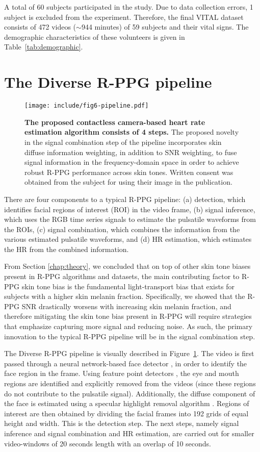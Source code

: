 A total of 60 subjects participated in the study. Due to data collection errors, 1 subject is excluded from the experiment. Therefore, the final VITAL dataset consists of 472 videos ($\sim$944 minutes) of 59 subjects and their vital signs. The demographic characteristics of these volunteers is given in Table~\ref{tab:demographic}.

\section{The Diverse R-PPG pipeline}

\begin{figure}
    \centering
    \texttt{[image: include/fig6-pipeline.pdf]}
    \caption{\textbf{The proposed contactless camera-based heart rate estimation algorithm consists of 4 steps.} The proposed novelty in the signal combination step of the pipeline incorporates skin diffuse information weighting, in addition to SNR weighting, to fuse signal information in the frequency-domain space in order to achieve robust R-PPG performance across skin tones. Written consent was obtained from the subject for using their image in the publication.}
    \label{fig:pipeline}
\end{figure}

There are four components to a typical R-PPG pipeline: (a) detection, which identifies facial regions of interest (ROI) in the video frame, (b) signal inference, which uses the RGB time series signals to estimate the pulsatile waveforms from the ROIs, (c) signal combination, which combines the information from the various estimated pulsatile waveforms, and (d) HR estimation, which estimates the HR from the combined information. 

From Section \ref{chap:theory}, we concluded that on top of other skin tone biases present in R-PPG algorithms and datasets, the main contributing factor to R-PPG skin tone bias is the fundamental light-transport bias that exists for subjects with a higher skin melanin fraction. Specifically, we showed that the R-PPG SNR drastically worsens with increasing skin melanin fraction, and therefore mitigating the skin tone bias present in R-PPG will require strategies that emphasize capturing more signal and reducing noise. As such, the primary innovation to the typical R-PPG pipeline will be in the signal combination step.  

The Diverse R-PPG pipeline is visually described in Figure~\ref{fig:pipeline}. The video is first passed through a neural network-based face detector \cite{zhang_joint_2016}, in order to identify the face region in the frame. Using feature point detectors \cite{kazemi_one_2014}, the eye and mouth regions are identified and explicitly removed from the videos (since these regions do not contribute to the pulsatile signal). Additionally, the diffuse component of the face is estimated using a specular highlight removal algorithm \cite{yang_real-time_2010}. Regions of interest are then obtained by dividing the facial frames into 192 grids of equal height and width. This is the detection step. The next steps, namely signal inference and signal combination and HR estimation, are carried out for smaller video-windows of 20 seconds length with an overlap of 10 seconds.

